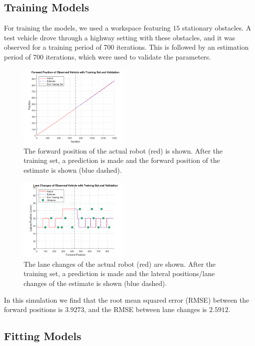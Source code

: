 \documentclass[letterpaper, 10 pt, conference]{ieeeconf}  %
\begin{document}
\subsection{Training Models}
For training the models, we used a workspace featuring $15$ stationary obstacles. A test vehicle drove through a highway setting with these obstacles, and it was observed for a training period of 700 iterations. This is followed by an estimation period of 700 iterations, which were used to validate the parameters.

\begin{figure}[ht]
    \includegraphics[width=0.48\textwidth]{train1.png}
    \caption{The forward position of the actual robot (red) is shown. After the training set, a prediction is made and the forward position of the estimate is shown (blue dashed).}
    \label{fig:train1}
\end{figure}

\begin{figure}[ht]
    \includegraphics[width=0.48\textwidth]{train2.png}
    \caption{The lane changes of the actual robot (red) are shown. After the training set, a prediction is made and the lateral positions/lane changes of the estimate is shown (blue dashed).}
    \label{fig:train2}
\end{figure}

In this simulation we find that the root mean squared error (RMSE) between the forward positions is $3.9273$, and the RMSE between lane changes is $2.5912$.  

\subsection{Fitting Models}
\end{document}
